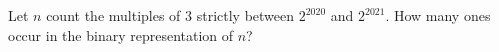 Let $n$ count the multiples of $3$ strictly between $2^{2020}$ and $2^{2021}$. How many ones occur in the binary representation of $n$?
